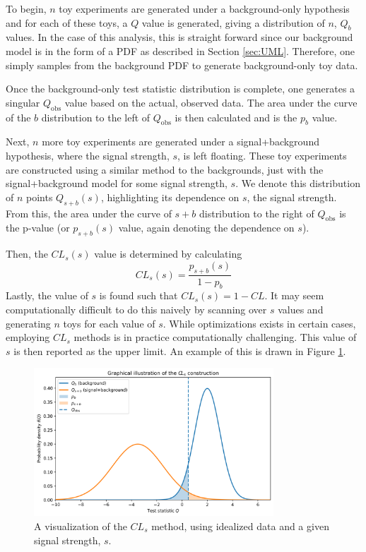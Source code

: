 To begin, $n$ toy experiments are generated under a background-only hypothesis and for each of these toys, a $Q$ value is generated, giving a distribution of $n$, $Q_b$ values. In the case of this analysis, this is straight forward since our background model is in the form of a PDF as described in Section \ref{sec:UML}. Therefore, one simply samples from the background PDF to generate background-only toy data. 

Once the background-only test statistic distribution is complete, one generates a singular $Q_{\text{obs}}$ value based on the actual, observed data. The area under the curve of the $b$ distribution to the left of $Q_{\text{obs}}$ is then calculated and is the $p_b$ value.

Next, $n$ more toy experiments are generated under a signal+background hypothesis, where the signal strength, $s$, is left floating. These toy experiments are constructed using a similar method to the backgrounds, just with the signal+background model for some signal strength, $s$. We denote this distribution of $n$ points $Q_{s+b}(s)$, highlighting its dependence on $s$, the signal strength. From this, the area under the curve of $s+b$ distribution to the right of $Q_{\text{obs}}$ is the p-value (or $p_{s+b}(s)$ value, again denoting the dependence on $s$). 

Then, the $CL_s(s)$ value is determined by calculating
\begin{equation}
    CL_s(s) = \frac{p_{s+b}(s)}{1-p_b}
\label{eq:cls}
\end{equation}
Lastly, the value of $s$ is found such that $CL_s(s) = 1-CL$. It may seem computationally difficult to do this naively by scanning over $s$ values and generating $n$ toys for each value of $s$. While optimizations exists in certain cases, employing $CL_s$ methods is in practice computationally challenging. This value of $s$ is then reported as the upper limit. An example of this is drawn in Figure \ref{fig:cls_visualization}.

\begin{figure}[h!]
    \begin{center}
      \includegraphics[width=0.8\textwidth]{figures/chapter4/cls_visualization.png}
    \end{center}
    \caption{
      A visualization of the $CL_s$ method, using idealized data and a given signal strength, $s$. 
    }
    \label{fig:cls_visualization}
\end{figure}

